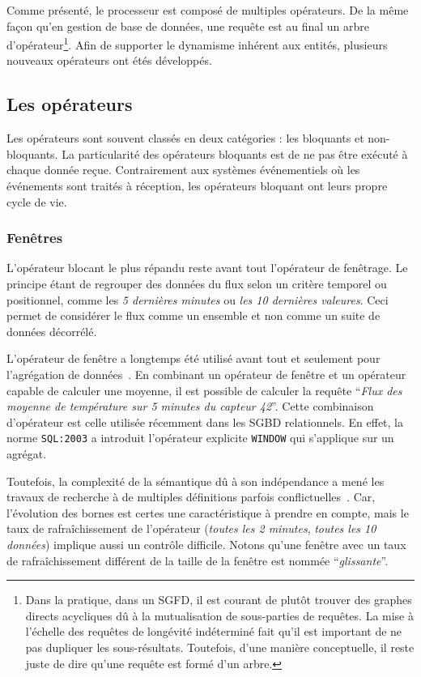 Comme présenté, le processeur est composé de multiples opérateurs. De la même façon qu'en gestion de base de données, une requête est au final un arbre d'opérateur\footnote{Dans la pratique, dans un SGFD, il est courant de plutôt trouver des graphes directs acycliques dû à la mutualisation de sous-parties de requêtes. La mise à l'échelle des requêtes de longévité indéterminé fait qu'il est important de ne pas dupliquer les sous-résultats. Toutefois, d'une manière conceptuelle, il reste juste de dire qu'une requête est formé d'un arbre.}.
Afin de supporter le dynamisme inhérent aux entités, plusieurs nouveaux opérateurs ont étés développés.

\subsection{Les opérateurs}
Les opérateurs sont souvent classés en deux catégories : les bloquants et non-bloquants. La particularité des opérateurs bloquants est de ne pas être exécuté à chaque donnée reçue. Contrairement aux systèmes événementiels où les événements sont traités à réception, les opérateurs bloquant ont leurs propre cycle de vie.
\subsubsection{Fenêtres}
L'opérateur blocant le plus répandu reste avant tout l'opérateur de fenêtrage. Le principe étant de regrouper des données du flux selon un critère temporel ou positionnel, comme les \textit{5 dernières minutes} ou \textit{les 10 dernières valeures}. Ceci permet de considérer le flux comme un ensemble et non comme un suite de données décorrélé.

L'opérateur de fenêtre a longtemps été utilisé avant tout et seulement pour l'agrégation de données~\cite{Madden:tag, Abadi:aurora}. En combinant un opérateur de fenêtre et un opérateur capable de calculer une moyenne, il est possible de calculer la requête \enquote{\it Flux des moyenne de température sur 5 minutes du capteur 42}. Cette combinaison d'opérateur est celle utilisée récemment dans les SGBD relationnels. En effet, la norme \verb|SQL:2003| a introduit l'opérateur explicite \verb|WINDOW| qui s'applique sur un agrégat.

Toutefois, la complexité de la sémantique dû à son indépendance a mené les travaux de recherche à de multiples définitions parfois conflictuelles~\cite{Jain:spread}. Car, l'évolution des bornes est certes une caractéristique à prendre en compte, mais le taux de rafraîchissement de l'opérateur (\textit{toutes les 2 minutes}, \textit{toutes les 10 données}) implique aussi un contrôle difficile. Notons qu'une fenêtre avec un taux de rafraîchissement différent de la taille de la fenêtre est nommée \enquote{\it glissante}.

